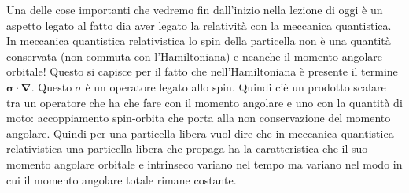 Una delle cose importanti che vedremo fin dall'inizio nella lezione di oggi è un aspetto legato al fatto dia aver legato la relatività con la meccanica quantistica. In meccanica quantistica relativistica lo spin della particella non è una quantità conservata (non commuta con l'Hamiltoniana) e neanche il momento angolare orbitale! Questo si capisce per il fatto che nell'Hamiltoniana è presente il termine $\boldsymbol{\sigma}\cdot\boldsymbol{\nabla}$. Questo $\sigma$ è un operatore legato allo spin. Quindi c'è un prodotto scalare tra un operatore che ha che fare con il momento angolare e uno con la quantità di moto: accoppiamento spin-orbita che porta alla non conservazione del momento angolare. Quindi per una particella libera vuol dire che in meccanica quantistica relativistica una particella libera che propaga ha la caratteristica che il suo momento angolare orbitale e intrinseco variano nel tempo ma variano nel modo in cui il momento angolare totale rimane costante.
